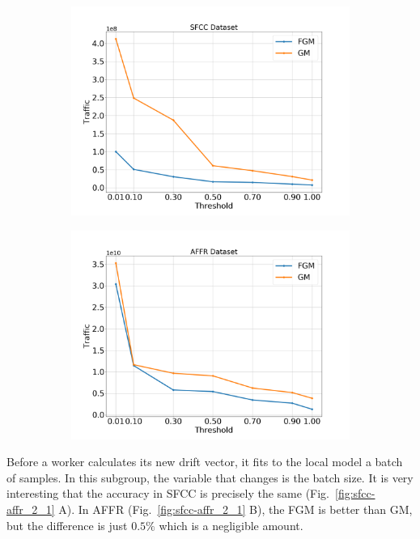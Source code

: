 \begin{figure}[H]
\begin{subfigure}[b]{0.45\textwidth}
        \includegraphics[width=\textwidth]{./images/results/sfc-plots/exp_Fig_1_3.png}
        \caption{}
    \end{subfigure}
    \hfill
    \begin{subfigure}[b]{0.45\textwidth}
        \centering
        \includegraphics[width=\textwidth]{./images/results/amazon-plots/exp_Fig_1_3.png}
        \caption{}
    \end{subfigure}
    \caption{}
    \label{fig:sfcc-affr_1}
\end{figure}

\newpage

Before a worker calculates its new drift vector, it fits to the local model a batch of samples.
In this subgroup, the variable that changes is the batch size.
It is very interesting that the accuracy in SFCC is precisely the same (Fig.~\ref{fig:sfcc-affr_2_1} A).
In AFFR (Fig.~\ref{fig:sfcc-affr_2_1} B), the FGM is better than GM, but the difference is just $0.5\%$ which is a negligible amount.

